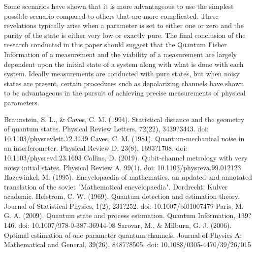 \documentclass[twocolumn]{article}
\begin{document}
Some scenarios have shown that it is more advantageous to use the simplest possible scenario compared to others that are more complicated. These revelations typically arise when a parameter is set to either one or zero and the purity of the state is either very low or exactly pure. The final conclusion of the research conducted in this paper should suggest that the Quantum Fisher Information of a measurement and the viability of a measurement are largely dependent upon the initial state of a system along with what is done with each system. Ideally measurements are conducted with pure states, but when noisy states are present, certain procedures such as depolarizing channels have shown to be advantageous in the pursuit of achieving precise measurements of physical parameters.
\newpage
\begin{thebibliography}{99}
Braunstein, S. L., \& Caves, C. M. (1994). Statistical distance and the geometry of quantum states. Physical Review Letters, 72(22), 3439?3443. doi: 10.1103/physrevlett.72.3439
Caves, C. M. (1981). Quantum-mechanical noise in an interferometer. Physical Review D, 23(8), 1693?1708. doi: 10.1103/physrevd.23.1693
Collins, D. (2019). Qubit-channel metrology with very noisy initial states. Physical Review A, 99(1). doi: 10.1103/physreva.99.012123
Hazewinkel, M. (1995). Encyclopaedia of mathematics. an updated and annotated translation of the soviet "Mathematical encyclopaedia". Dordrecht: Kulver academic.
Helstrom, C. W. (1969). Quantum detection and estimation theory. Journal of Statistical Physics, 1(2), 231?252. doi: 10.1007/bf01007479
Paris, M. G. A. (2009). Quantum state and process estimation. Quantum Information, 139?146. doi: 10.1007/978-0-387-36944-08
Sarovar, M., \& Milburn, G. J. (2006). Optimal estimation of one-parameter quantum channels. Journal of Physics A: Mathematical and General, 39(26), 8487?8505. doi: 10.1088/0305-4470/39/26/015
\end{thebibliography}
\end{document}
